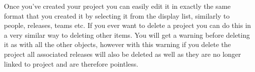 Once you've created your project you can easily edit it in exactly the same format that you created it by selecting it from the display list, similarly to people, releases, teams etc. If you ever want to delete a project you can do this in a very similar way to deleting other items. You will get a warning before deleting it as with all the other objects, however with this warning if you delete the project all associated releases will also be deleted as well as they are no longer linked to project and are therefore pointless.